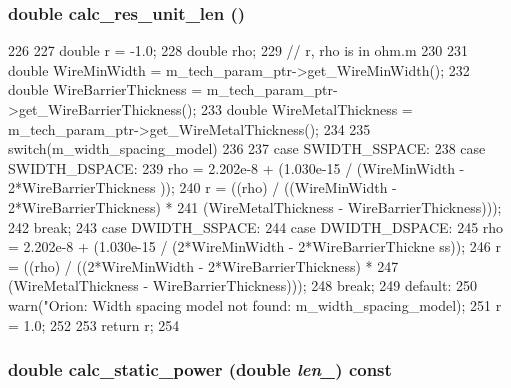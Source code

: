 \hypertarget{classWire_a564f10276cadbde4eeab5ed642ccfea5}{
\subsubsection[{calc\_\-res\_\-unit\_\-len}]{\setlength{\rightskip}{0pt plus 5cm}double calc\_\-res\_\-unit\_\-len ()}}
\label{classWire_a564f10276cadbde4eeab5ed642ccfea5}



\begin{DoxyCode}
226 {
227     double r = -1.0;
228     double rho;
229     // r, rho is in ohm.m
230 
231     double WireMinWidth = m_tech_param_ptr->get_WireMinWidth();
232     double WireBarrierThickness = m_tech_param_ptr->get_WireBarrierThickness();
233     double WireMetalThickness = m_tech_param_ptr->get_WireMetalThickness();
234 
235     switch(m_width_spacing_model)
236     {
237         case SWIDTH_SSPACE:
238         case SWIDTH_DSPACE:
239             rho = 2.202e-8 + (1.030e-15  / (WireMinWidth - 2*WireBarrierThickness
      ));
240             r = ((rho) / ((WireMinWidth - 2*WireBarrierThickness) *
241                         (WireMetalThickness - WireBarrierThickness)));
242             break;
243         case DWIDTH_SSPACE:
244         case DWIDTH_DSPACE:
245             rho = 2.202e-8 + (1.030e-15  / (2*WireMinWidth - 2*WireBarrierThickne
      ss));
246             r = ((rho) / ((2*WireMinWidth - 2*WireBarrierThickness) *
247                         (WireMetalThickness - WireBarrierThickness)));
248             break;
249         default:
250             warn("Orion: Width spacing model not found: %
      m_width_spacing_model);
251             r = 1.0;
252     }
253     return r;
254 }
\end{DoxyCode}
\hypertarget{classWire_a391cd6cda69a9f032580f7efe6ad0916}{
\subsubsection[{calc\_\-static\_\-power}]{\setlength{\rightskip}{0pt plus 5cm}double calc\_\-static\_\-power (double {\em len\_\-}) const}}
\label{classWire_a391cd6cda69a9f032580f7efe6ad0916}



